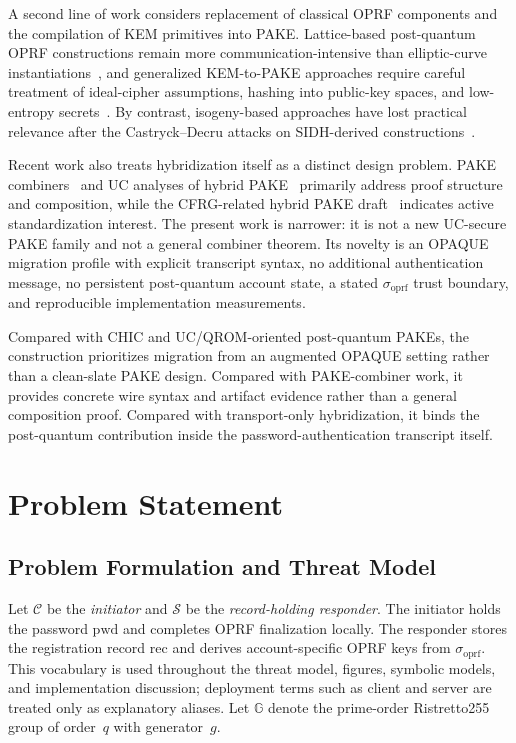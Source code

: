 \documentclass[preprint,12pt]{elsarticle}
\newcommand{\sigoprf}{\sigma_{\mathrm{oprf}}}
\theoremstyle{remark}
\begin{document}
A second line of work considers replacement of classical OPRF
components and the compilation of KEM primitives into PAKE.
Lattice-based post-quantum OPRF constructions remain
more communication-intensive than elliptic-curve instantiations~\cite{esgin2024}, and generalized KEM-to-PAKE approaches require
careful treatment of ideal-cipher assumptions, hashing into public-key
spaces, and low-entropy secrets~\cite{arriaga2024}. By contrast,
isogeny-based approaches have lost practical relevance after the
Castryck--Decru attacks on SIDH-derived constructions~\cite{castryck2023}.

Recent work also treats hybridization itself as a distinct design
problem. PAKE combiners~\cite{hesse2024} and UC analyses of hybrid
PAKE~\cite{lyu2024hybrid} primarily address proof structure and
composition, while the CFRG-related hybrid PAKE draft~\cite{vos2025}
indicates active standardization interest. The present work is narrower:
it is not a new UC-secure PAKE family and not a general combiner theorem.
Its novelty is an OPAQUE migration profile with explicit transcript
syntax, no additional authentication message, no persistent
post-quantum account state, a stated $\sigoprf$ trust boundary, and
reproducible implementation measurements.

Compared with CHIC and UC/QROM-oriented post-quantum PAKEs, the
construction prioritizes migration from an augmented OPAQUE setting
rather than a clean-slate PAKE design. Compared with PAKE-combiner work,
it provides concrete wire syntax and artifact evidence rather than a
general composition proof. Compared with transport-only hybridization, it
binds the post-quantum contribution inside the password-authentication
transcript itself.

\section{Problem Statement}

\subsection{Problem Formulation and Threat Model}

Let $\mathcal{C}$ be the \emph{initiator} and $\mathcal{S}$ be the
\emph{record-holding responder}. The initiator holds the password
$\mathrm{pwd}$ and completes OPRF finalization locally. The responder
stores the registration record $\mathrm{rec}$ and derives
account-specific OPRF keys from $\sigoprf$. This vocabulary is used
throughout the threat model, figures, symbolic models, and implementation
discussion; deployment terms such as client and server are treated only
as explanatory aliases. Let $\mathbb{G}$ denote the
prime-order Ristretto255 group of order~$q$ with generator~$g$.
\end{document}
